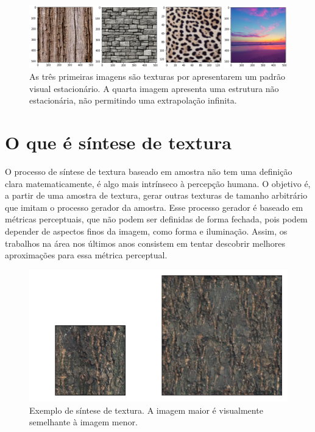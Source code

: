\begin{figure}[!ht]
	\includegraphics[width=\linewidth]{files/assets/texture.png}
	\caption{As três primeiras imagens são texturas por apresentarem
	um padrão visual estacionário. A quarta imagem apresenta
    uma estrutura não estacionária, não permitindo uma extrapolação
	infinita.}
	\label{img:preview}
\end{figure}


 

\section{O que é síntese de textura}


O processo de síntese de textura baseado
em amostra não tem uma definição clara
matematicamente, é algo mais intrínseco
à percepção humana. O objetivo é,
a partir de uma amostra de textura,
gerar outras texturas de tamanho
arbitrário que imitam o processo
gerador da amostra. Esse processo
gerador é baseado em métricas
perceptuais, que não podem ser
definidas de forma fechada, pois
podem depender de aspectos
finos da imagem, como forma e 
iluminação.
Assim, os trabalhos na área
nos últimos anos consistem em
tentar descobrir melhores aproximações
para essa métrica perceptual.

\begin{figure}[!ht]
	\centering
	\includegraphics[width=\linewidth*2/3]{files/assets/sinth.png}
	\caption{Exemplo de síntese de textura. A imagem
	maior é visualmente semelhante à imagem menor.}
	\label{img:preview}
\end{figure}


